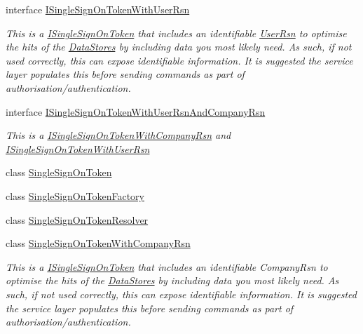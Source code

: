 \begin{DoxyCompactItemize}
interface \hyperlink{interfaceCqrs_1_1Authentication_1_1ISingleSignOnTokenWithUserRsn}{I\+Single\+Sign\+On\+Token\+With\+User\+Rsn}
\begin{DoxyCompactList}\small\item\em This is a \hyperlink{interfaceCqrs_1_1Authentication_1_1ISingleSignOnToken}{I\+Single\+Sign\+On\+Token} that includes an identifiable \hyperlink{interfaceCqrs_1_1Authentication_1_1ISingleSignOnTokenWithUserRsn_a3ba8dbde50e032ebc76c96a5ff40f47f_a3ba8dbde50e032ebc76c96a5ff40f47f}{User\+Rsn} to optimise the hits of the \hyperlink{}{Data\+Stores} by including data you most likely need. As such, if not used correctly, this can expose identifiable information. It is suggested the service layer populates this before sending commands as part of authorisation/authentication. \end{DoxyCompactList}\item 
interface \hyperlink{interfaceCqrs_1_1Authentication_1_1ISingleSignOnTokenWithUserRsnAndCompanyRsn}{I\+Single\+Sign\+On\+Token\+With\+User\+Rsn\+And\+Company\+Rsn}
\begin{DoxyCompactList}\small\item\em This is a \hyperlink{interfaceCqrs_1_1Authentication_1_1ISingleSignOnTokenWithCompanyRsn}{I\+Single\+Sign\+On\+Token\+With\+Company\+Rsn} and \hyperlink{interfaceCqrs_1_1Authentication_1_1ISingleSignOnTokenWithUserRsn}{I\+Single\+Sign\+On\+Token\+With\+User\+Rsn} \end{DoxyCompactList}\item 
class \hyperlink{classCqrs_1_1Authentication_1_1SingleSignOnToken}{Single\+Sign\+On\+Token}
\item 
class \hyperlink{classCqrs_1_1Authentication_1_1SingleSignOnTokenFactory}{Single\+Sign\+On\+Token\+Factory}
\item 
class \hyperlink{classCqrs_1_1Authentication_1_1SingleSignOnTokenResolver}{Single\+Sign\+On\+Token\+Resolver}
\item 
class \hyperlink{classCqrs_1_1Authentication_1_1SingleSignOnTokenWithCompanyRsn}{Single\+Sign\+On\+Token\+With\+Company\+Rsn}
\begin{DoxyCompactList}\small\item\em This is a \hyperlink{interfaceCqrs_1_1Authentication_1_1ISingleSignOnToken}{I\+Single\+Sign\+On\+Token} that includes an identifiable Company\+Rsn to optimise the hits of the \hyperlink{}{Data\+Stores} by including data you most likely need. As such, if not used correctly, this can expose identifiable information. It is suggested the service layer populates this before sending commands as part of authorisation/authentication. \end{DoxyCompactList}\item 

\end{DoxyCompactItemize}
